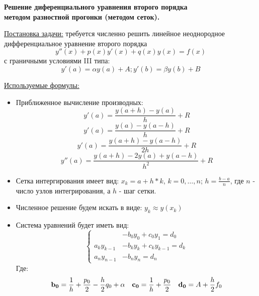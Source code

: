 \documentclass[a4paper,12pt]{report}
\begin{document}
\begin{center}
\Large
{\bf Решение диференциального уравнения второго порядка \\ методом разностной прогонки (методом сеток).}
\end{center}

\underline{Постановка задачи:} требуется численно решить линейное неоднородное дифференциальное уравнение второго порядка
\begin{equation}
y''(x) + p(x)y'(x) + q(x)y(x) = f(x)
\end{equation}
с граничными условиями III типа:
\begin{equation}
y'(a) = \alpha y(a) + A ; 
y'(b) = \beta y(b) + B
\end{equation}

\underline{Используемые формулы:} 
\begin{itemize}
\item{Приближенное вычисление производных:
\begin{equation}
y'(a) = \frac{y(a+h) - y(a)}{h} + R
\end{equation}
\begin{equation}
y'(a) = \frac{y(a) - y(a-h)}{h} + R
\end{equation}
\begin{equation}
y'(a) = \frac{y(a+h) - y(a-h)}{2h} + R
\end{equation}
\begin{equation}
y''(a) = \frac{y(a+h) - 2y(a) + y(a-h)}{h^2} + R
\end{equation}
}
\item{Сетка интергирования имеет вид: $x_k = a + h * k$, $k = 0, \ldots, n$; $h = \frac{b-a}{n}$, где $n$ - число узлов интегрирования, а $h$ - шаг сетки.}
\item{Численное решение будем искать в виде: $y_k \approx y(x_k)$}
\item{Система уравнений будет иметь вид:
\begin{equation}
\left \{ \begin{aligned} 
& -b_{0}y_0 + c_{0}y_1 = d_0 \\ 
a_{k}y_{k-1} & - b_{k}y_k + c_{k}y_{k-1} = d_k \\ 
a_{n}y_{n-1} & - b_{n}y_n = d_n 
\end{aligned} \right.
\end{equation}
Где:
\begin{equation}
\begin{aligned}
{\bf b_0} & = \frac{1}{h} + \frac{p_0}{2} - \frac{h}{2}q_0 + \alpha & {\bf c_0} & = \frac{1}{h} + \frac{p_0}{2} & {\bf d_0} & = A + \frac{h}{2}f_0 \\

\end{aligned}
\end{equation}}
\end{itemize}
\end{document}
